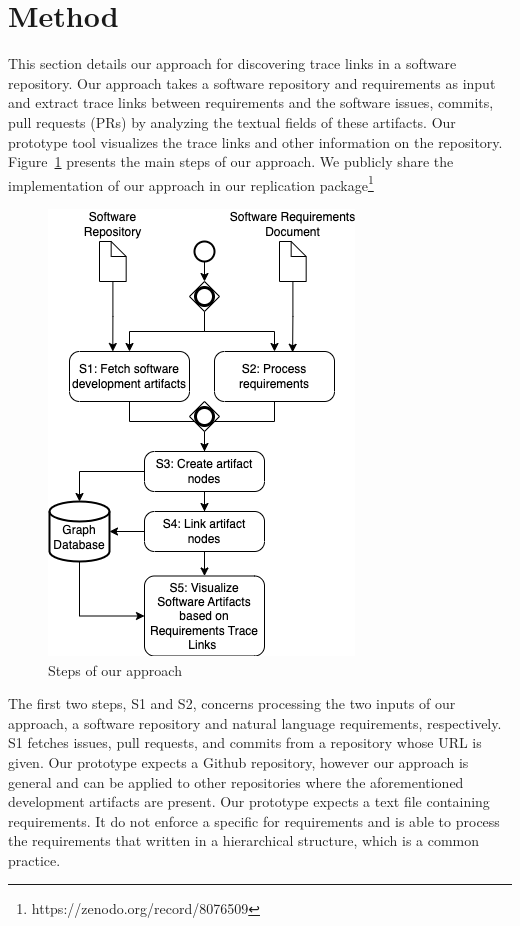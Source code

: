 \section{Method}
\label{sec:approach}

This section details our approach for discovering trace links in a software repository. Our approach takes a software repository and requirements as input and extract trace links between requirements and the software issues, commits, pull requests (PRs) by analyzing the textual fields of these artifacts. Our prototype tool visualizes the trace links and other information on the repository. Figure~\ref{fig:sys-flow} presents the main steps of our approach. We publicly share the implementation of our approach in our replication package\footnote{https://zenodo.org/record/8076509}

\begin{figure}[htb]
    \centering
    \includegraphics[width=0.65\linewidth]{figs/approach.png}
    \caption{Steps of our approach}
    \label{fig:sys-flow}
  \end{figure}

  The first two steps, \textsf{S1} and \textsf{S2}, concerns processing the two inputs of our approach, a software repository and natural language requirements, respectively. \textsf{S1} fetches issues, pull requests, and commits from a repository whose URL is given. Our prototype expects a Github repository, however our approach is general and can be applied to other repositories where the aforementioned development artifacts are present. %
  Our prototype expects a text file containing requirements. It do not enforce a specific for requirements and is able to process the requirements that written in a hierarchical structure, which is a common practice.


